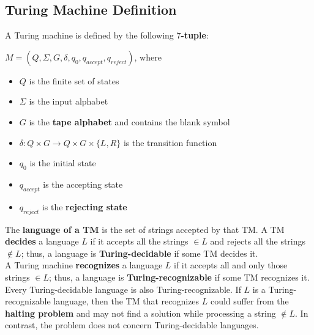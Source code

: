 \documentclass{article}
\begin{document}
\subsection{Turing Machine Definition}
A Turing machine is defined by the following \textbf{$7$-tuple}:
\begin{center}
    $M = (Q, \Sigma, G, \delta, q_0, q_{accept}, q_{reject})$, where
\end{center}
\begin{itemize}
    \item $Q$ is the finite set of states
    \item $\Sigma$ is the input alphabet
    \item $G$ is the \textbf{tape alphabet} and contains the blank symbol
    \item $\delta:Q\times G\rightarrow Q\times G\times\{L,R\}$ is the transition function
    \item $q_0$ is the initial state
    \item $q_{accept}$ is the accepting state
    \item $q_{reject}$ is the \textbf{rejecting state}
\end{itemize}
The \textbf{language of a TM} is the set of strings accepted by that TM. A TM \textbf{decides} a language $L$ if it accepts all the strings $\in L$ and rejects all the strings $\notin L$; thus, a language is \textbf{Turing-decidable} if some TM decides it. \\
A Turing machine \textbf{recognizes} a language $L$ if it accepts all and only those strings $\in L$; thus, a language is \textbf{Turing-recognizable} if some TM recognizes it. \\
Every Turing-decidable language is also Turing-recognizable. If $L$ is a Turing-recognizable language, then the TM that recognizes $L$ could suffer from the \textbf{halting problem} and may not find a solution while processing a string $\notin L$. In contrast, the problem does not concern Turing-decidable languages.
\end{document}
